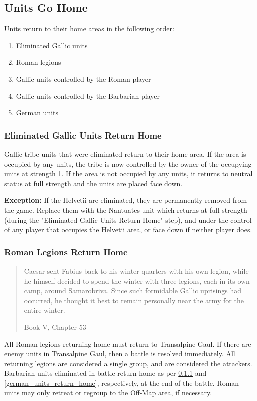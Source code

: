 \begin{samepage}
\subsection{Units Go Home}
\par
Units return to their home areas in the following order:
\begin{enumerate}
  \setlength\itemsep{0em}
  \item {\small Eliminated Gallic units}
  \item {\small Roman legions}
  \item {\small Gallic units controlled by the Roman player}
  \item {\small Gallic units controlled by the Barbarian player}
  \item {\small German units}
\end{enumerate}
\end{samepage}

\subsubsection{Eliminated Gallic Units Return Home}
\label{eliminated_gallic_units_return_home}
\par
Gallic tribe units that were eliminated return to their home area. If the area is occupied by any units, the tribe is now controlled by the owner of the occupying units at strength 1. If the area is not occupied by any units, it returns to neutral status at full strength and the units are placed face down.

\textbf{Exception:} If the Helvetii are eliminated, they are permanently removed from the game. Replace them with the Nantuates unit which returns at full strength (during the "Eliminated Gallic Units Return Home" step), and under the control of any player that occupies the Helvetii area, or face down if neither player does.

\subsubsection{Roman Legions Return Home}
\blockquote[Book V, Chapter 53]{Caesar sent Fabius back to his winter quarters with his own legion, while he himself decided to spend the winter with three legions, each in its own camp, around Samarobriva. Since such formidable Gallic uprisings had occurred, he thought it best to remain personally near the army for the entire winter.}
\par
All Roman legions returning home must return to Transalpine Gaul. If there are enemy units in Transalpine Gaul, then a battle is resolved immediately. All returning legions are considered a single group, and are considered the attackers. Barbarian units eliminated in battle return home as per \ref{eliminated_gallic_units_return_home} and \ref{german_units_return_home}, respectively, at the end of the battle. Roman units may only retreat or regroup to the Off-Map area, if necessary.

